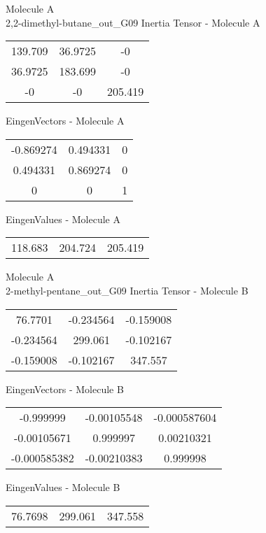 \newpage
\begin{multicols}{2}
\begin{center}
Molecule A \\ 
2,2-dimethyl-butane_out_G09
Inertia Tensor - Molecule A \\
\vtab
\begin{tabular}{|c c c|}
139.709	 & 	36.9725	 & 	-0	 \\
36.9725	 & 	183.699	 & 	-0	 \\
-0	 & 	-0	 & 	205.419
\end{tabular}

\vtab
 EingenVectors - Molecule A     \\
\vtab
\begin{tabular}{|c c c|}
-0.869274	 & 	0.494331	 & 	0	 \\
0.494331	 & 	0.869274	 & 	0	 \\
0	 & 	0	 & 	1
\end{tabular}

\vtab
 EingenValues - Molecule A     \\
\vtab
\begin{tabular}{|c c c|}
118.683	 & 	204.724	 & 	205.419
\end{tabular}
\columnbreak
Molecule A \\ 
2-methyl-pentane_out_G09
Inertia Tensor - Molecule B \\
\vtab
\begin{tabular}{|c c c|}
76.7701	 & 	-0.234564	 & 	-0.159008	 \\
-0.234564	 & 	299.061	 & 	-0.102167	 \\
-0.159008	 & 	-0.102167	 & 	347.557
\end{tabular}

\vtab
 EingenVectors - Molecule B     \\
\vtab
\begin{tabular}{|c c c|}
-0.999999	 & 	-0.00105548	 & 	-0.000587604	 \\
-0.00105671	 & 	0.999997	 & 	0.00210321	 \\
-0.000585382	 & 	-0.00210383	 & 	0.999998
\end{tabular}

\vtab
 EingenValues - Molecule B     \\
\vtab
\begin{tabular}{|c c c|}
76.7698	 & 	299.061	 & 	347.558
\end{tabular}
\end{center}
\end{multicols}
